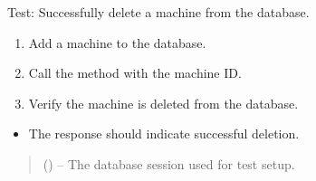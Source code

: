 \documentclass[letterpaper,10pt,english]{sphinxmanual}
\begin{document}
\begin{fulllineitems}
\label{\detokenize{test:test.test_machine.test_delete_machine_success}}
\pysigstartsignatures
\pysiglinewithargsret
{}
{}
{}
\pysigstopsignatures
\sphinxAtStartPar
Test: Successfully delete a machine from the database.
\begin{description}
\begin{enumerate}
%
\item {} 
\sphinxAtStartPar
Add a machine to the database.

\item {} 
\sphinxAtStartPar
Call the  method with the machine ID.

\item {} 
\sphinxAtStartPar
Verify the machine is deleted from the database.

\end{enumerate}

\begin{itemize}
\item {} 
\sphinxAtStartPar
The response should indicate successful deletion.

\end{itemize}

\end{description}
\begin{quote}\begin{description}
\sphinxAtStartPar
{} () – The database session used for test setup.

\end{description}\end{quote}

\end{fulllineitems}

\end{document}
